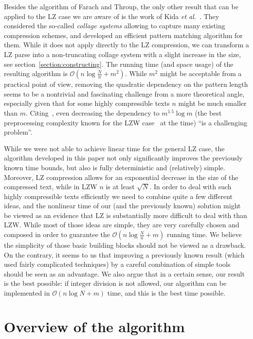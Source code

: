 \documentclass[runningheads]{llncs}
\begin{document}
Besides the algorithm of Farach and Throup, the only other result that can be applied to the LZ case we are aware of is the work of Kida \emph{et al.}~\cite{Kida}. They considered the so-called \emph{collage systems} allowing to capture many existing compression schemes, and developed an efficient pattern matching algorithm for them. While it does not apply directly to the LZ compression, we can transform a LZ parse into a non-truncating collage system with a slight increase in the size, see section~\ref{section:constructing}. The running time (and space usage) of the resulting algorithm is $\mathcal{O}(n\log\frac{N}{n}+m^{2})$. While $m^{2}$ might be acceptable from a practical point of view, removing the quadratic dependency on the pattern length seems to be a nontrivial and fascinating challenge from a more theoretical angle, especially given that for some highly compressible texts $n$ might be much smaller than $m$. Citing~\cite{Kida}, even decreasing the dependency to $m^{1.5}\log m$ (the best preprocessing complexity known for the LZW case~\cite{Kosaraju} at the time) ``is a challenging problem''.

While we were not able to achieve linear time for the general LZ case, the algorithm developed in this paper not only significantly improves the previously known time bounds, but also is fully deterministic and (relatively) simple. Moreover, LZ compression allows for an exponential decrease in the size of the compressed text, while in LZW $n$ is at least $\sqrt{N}$. In order to deal with such highly compressible texts efficiently we need to combine quite a few different ideas, and the nonlinear time of our (and the previously known) solution might be viewed as an evidence that LZ is substantially more difficult to deal with than LZW. While most of those ideas are simple, they are very carefully chosen and composed in order to guarantee the $\mathcal{O}(n\log\frac{N}{n}+m)$ running time. We believe the simplicity of those basic building blocks should not be viewed as a drawback. On the contrary, it seems to us that improving a previously known result (which used fairly complicated techniques) by a careful combination of simple tools should be seen as an advantage. We also argue that in a certain sense, our result is the best possible: if integer division is not allowed, our algorithm can be implemented in $\mathcal{O}(n\log N+m)$ time, and this is the best time possible.

\section{Overview of the algorithm}
\end{document}
